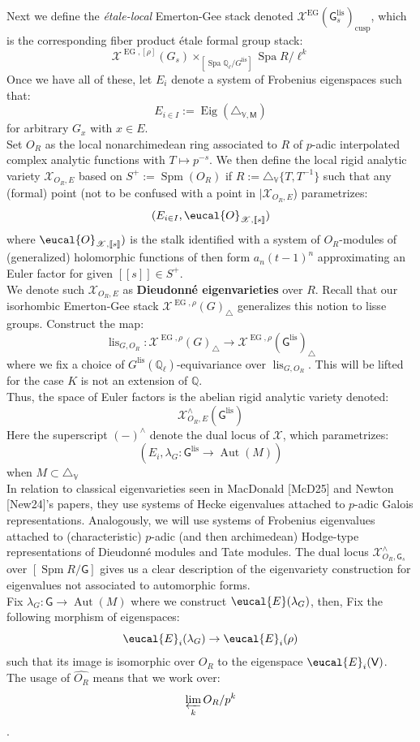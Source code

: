 \documentclass[9pt]{amsart}
\let\texcal\mathcal
\renewcommand{\[}{\begin{equation}}
\renewcommand{\]}{\end{equation}}
\newcommand{\on}{\operatorname}
\theoremstyle{plain}
\theoremstyle{remark}
\begin{document}
Next we define the \textit{étale-local} Emerton-Gee stack denoted $\texcal{X}^{\on{EG}}(\mathsf{G}^{\on{lis}}_s)_{\on{cusp}}$, which is the corresponding fiber product étale formal group stack:
\[\texcal{X}^{\on{EG}, [\rho]}(G_s) \times_{[\on{Spa} \mathbb{Q}_{\ell}/G^{\on{lis}}]} \on{Spa} R/\ell^k\]
Once we have all of these, let $E_i$ denote a system of Frobenius eigenspaces such that:
\[E_{i \in I} := \on{Eig}(\triangle_{\mathbb{V}, \mathsf{M}})\]
for arbitrary $G_x$ with $x \in E$.\\
Set $O_R$ as the local nonarchimedean ring associated to $R$ of $p$-adic interpolated complex analytic functions with $T \mapsto p^{-s}$.
We then define the local rigid analytic variety $\mathscr{X}_{O_R, E}
$ based on $S^+ := \on{Spm}(O_R)$ if $R := \triangle_{\mathbb{V}}\{T, T^{-1}\}$ such that any (formal) point (not to be confused with a point in $|\mathscr{X}_{O_R, E}$) parametrizes:
\[(E_{i \in I}, \eucal{O}_{\mathscr{X}, [\![s]\!]})\]
where $\eucal{O}_{\mathscr{X}, [\![s]\!]})$ is the stalk identified with a system of $O_R$-modules of (generalized) holomorphic functions of then form $a_n (t-1)^n$ approximating an Euler factor for given $[\![s]\!] \in S^+$.\\
We denote such $\mathscr{X}_{O_R, E}$ as \textbf{Dieudonné eigenvarieties} over $R$. Recall that our isorhombic Emerton-Gee stack $\texcal{X}^{\on{EG}, \rho}(G)_{\triangle}$ generalizes this notion to lisse groups. Construct the map:
\[\on{lis}_{G, O_R}: \texcal{X}^{\on{EG}, \rho}(G)_{\triangle} \to \texcal{X}^{\on{EG}, \rho}(\mathsf{G}^{\text{lis}})_{\triangle}\]
where we fix a choice of $G^{\on{lis}}
(\mathbb{Q}_{\ell})$-equivariance over $\on{lis}_{G, O_R}$. This will be lifted for the case $K$ is not an extension of $\mathbb{Q}$.\\
Thus, the space of Euler factors is the abelian rigid analytic variety denoted:
\[\mathscr{X}^{\wedge}_{O_R, E}(\mathsf{G}^{\on{lis}})\]
Here the superscript $(-)^{\wedge}$ denote the dual locus of $\mathscr{X}$, which parametrizes:
\[(E_i, \lambda_G: \mathsf{G}^{\on{lis}} \to \on{Aut}(M))\] when $M \subset \triangle_{\mathbb{V}}$ \\
In relation to classical eigenvarieties seen in  MacDonald [McD25] and Newton [New24]'s papers, they use systems of Hecke eigenvalues attached to $p$-adic Galois representations. Analogously, we will use systems of Frobenius eigenvalues attached to (characteristic) $p$-adic (and then archimedean) Hodge-type representations of Dieudonné modules and Tate modules. The dual locus $\mathscr{X}^{\wedge}_{O_R, \mathsf{G}_s}$ over $[\on{Spm} R/\mathsf{G}]$ gives us a clear description of the eigenvariety construction for eigenvalues not associated to automorphic forms.\\
Fix $\lambda_G: \mathsf{G} \to \on{Aut}(M)$ where we construct $\eucal{E}(\lambda_G)$, then,
Fix the following morphism of eigenspaces:
\[\eucal{E}_i(\lambda_G) \to \eucal{E}_i(\rho)\]
such that its image is isomorphic over $O_R$ to the eigenspace $\eucal{E}_i(\mathsf{V})$.\\
The usage of $\widehat{O_R}$ means that we work over: \[\varprojlim_{k} O_R/p^k\].\\
\end{document}
